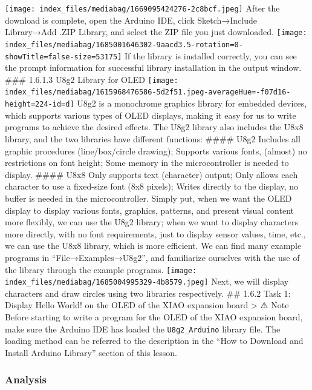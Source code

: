 \documentclass[
  letterpaper,
  DIV=11,
  numbers=noendperiod]{scrreprt}
\begin{document}
\texttt{[image: index\_files/mediabag/1669095424276-2c8bcf.jpeg]} After
the download is complete, open the Arduino IDE, click Sketch→Include
Library→Add .ZIP Library, and select the ZIP file you just downloaded.
\texttt{[image: index\_files/mediabag/1685001646302-9aacd3.5-rotation=0-showTitle=false-size=53175]}
If the library is installed correctly, you can see the prompt
information for successful library installation in the output window.
\#\#\# 1.6.1.3 U8g2 Library for OLED
\texttt{[image: index\_files/mediabag/1615968476586-5d2f51.jpeg-averageHue=-f07d16-height=224-id=d]}
U8g2 is a monochrome graphics library for embedded devices, which
supports various types of OLED displays, making it easy for us to write
programs to achieve the desired effects. The U8g2 library also includes
the U8x8 library, and the two libraries have different functions:
\#\#\#\# U8g2 Includes all graphic procedures (line/box/circle drawing);
Supports various fonts, (almost) no restrictions on font height; Some
memory in the microcontroller is needed to display. \#\#\#\# U8x8 Only
supports text (character) output; Only allows each character to use a
fixed-size font (8x8 pixels); Writes directly to the display, no buffer
is needed in the microcontroller. Simply put, when we want the OLED
display to display various fonts, graphics, patterns, and present visual
content more flexibly, we can use the U8g2 library; when we want to
display characters more directly, with no font requirements, just to
display sensor values, time, etc., we can use the U8x8 library, which is
more efficient. We can find many example programs in
``File→Examples→U8g2'', and familiarize ourselves with the use of the
library through the example programs.
\texttt{[image: index\_files/mediabag/1685004995329-4b8579.jpeg]} Next,
we will display characters and draw circles using two libraries
respectively. \#\# 1.6.2 Task 1: Display Hello World! on the OLED of the
XIAO expansion board \textgreater{} ⚠️ Note Before starting to write a
program for the OLED of the XIAO expansion board, make sure the Arduino
IDE has loaded the \texttt{U8g2\_Arduino} library file. The loading
method can be referred to the description in the ``How to Download and
Install Arduino Library'' section of this lesson.

\hypertarget{analysis-2}{%
\subsubsection*{Analysis}\label{analysis-2}}
\end{document}
